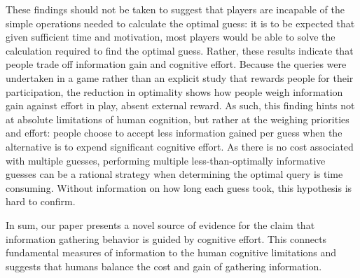 \documentclass[10pt,letterpaper]{article}
\begin{document}
These findings should not be taken to suggest that players are incapable of the simple operations needed to calculate the optimal guess: it is to be expected that given sufficient time and motivation, most players would be able to solve the calculation required to find the optimal guess. 
Rather, these results indicate that people trade off information gain and cognitive effort. Because the queries were undertaken in a game rather than an explicit study that rewards people for their participation, the reduction in optimality shows how people weigh information gain against effort in play, absent external reward.
As such, this finding hints not at absolute limitations of human cognition, but rather at the weighing priorities and effort: people choose to accept less information gained per guess when the alternative is to expend significant cognitive effort. 
As there is no cost associated with multiple guesses, performing multiple less-than-optimally informative guesses can be a rational strategy when determining the optimal query is time consuming. Without information on how long each guess took, this hypothesis is hard to confirm. 

In sum, our paper presents a novel source of evidence for the claim that information gathering behavior is guided by cognitive effort. This connects fundamental measures of information to the human cognitive limitations and suggests that humans balance the cost and gain of gathering information. 



\setlength{\bibleftmargin}{.125in}
\setlength{\bibindent}{-\bibleftmargin}

\typeout{} 

\end{document}
